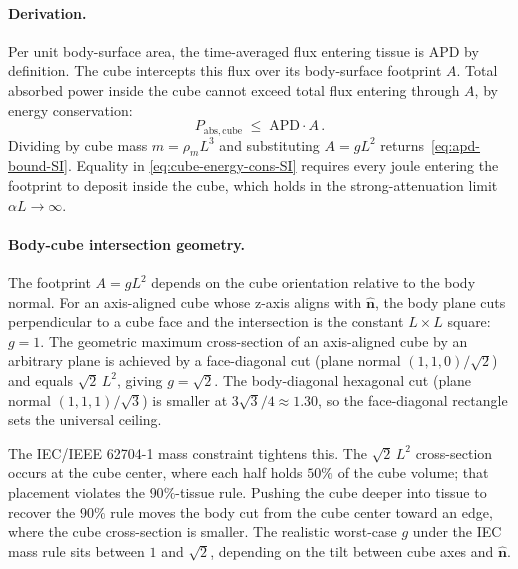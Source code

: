 \documentclass[journal,twocolumn,10pt]{IEEEtran}
\theoremstyle{plain}
\theoremstyle{remark}
\newcommand{\nhat}{\hat{\bm{n}}}
\newcommand{\APD}{\mathrm{APD}}
\begin{document}
\paragraph{Derivation.}
Per unit body-surface area, the time-averaged flux entering tissue is
$\APD$ by definition. The cube intercepts this flux over its
body-surface footprint $A$. Total absorbed power inside the cube
cannot exceed total flux entering through $A$, by energy conservation:
\begin{equation}\label{eq:cube-energy-cons-SI}
  P_{\mathrm{abs, cube}} \;\le\; \APD \cdot A\, .
\end{equation}
Dividing by cube mass $m = \rho_m L^3$ and substituting $A = g L^2$
returns~\eqref{eq:apd-bound-SI}. Equality in
\eqref{eq:cube-energy-cons-SI} requires every joule entering the
footprint to deposit inside the cube, which holds in the
strong-attenuation limit $\alpha L \to \infty$.

\paragraph{Body-cube intersection geometry.}
The footprint $A = g L^2$ depends on the cube orientation relative to
the body normal. For an axis-aligned cube whose z-axis aligns with
$\nhat$, the body plane cuts perpendicular to a cube face and the
intersection is the constant $L \times L$ square: $g = 1$.
The geometric maximum cross-section of an axis-aligned cube by an
arbitrary plane is achieved by a face-diagonal cut (plane normal
$(1,1,0)/\sqrt{2}$) and equals $\sqrt{2}\,L^2$, giving $g = \sqrt{2}$.
The body-diagonal hexagonal cut (plane normal $(1,1,1)/\sqrt{3}$) is
smaller at $3\sqrt{3}/4 \approx 1.30$, so the face-diagonal rectangle
sets the universal ceiling.

The IEC/IEEE 62704-1 mass constraint tightens this. The
$\sqrt{2}\,L^2$ cross-section occurs at the cube center, where each
half holds $50\%$ of the cube volume; that placement violates the
$90\%$-tissue rule. Pushing the cube deeper into tissue to recover
the $90\%$ rule moves the body cut from the cube center toward an
edge, where the cube cross-section is smaller. The realistic worst-case
$g$ under the IEC mass rule sits between $1$ and $\sqrt{2}$, depending
on the tilt between cube axes and $\nhat$.
\end{document}

